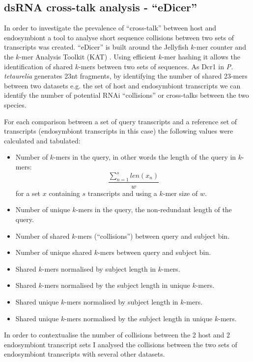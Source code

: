 \subsection{dsRNA cross-talk analysis - ``eDicer''}

In order to investigate the prevalence of ``cross-talk'' between 
host and endosymbiont a tool to analyse short sequence collisions between two sets
of transcripts was created.  ``eDicer'' is built around 
the Jellyfish \(k\)-mer counter \citep{Marcais2011} 
and the \(k\)-mer Analysis Toolkit (KAT) \citep{ClavijoKAT}.  Using efficient
\(k\)-mer hashing it allows the identification of shared \(k\)-mers between
two sets of sequences.  As Dcr1 in \textit{P. tetaurelia} generates
23nt fragments, by identifying the number of shared 23-mers between
two datasets e.g. the set of host and endosymbiont transcripts 
we can identify the number of potential RNAi ``collisions'' or cross-talks
between the two species. 

For each comparison between a set of query transcripts and a reference
set of transcripts (endosymbiont transcripts in this case)
the following
values were calculated and tabulated:
\begin{itemize}
    \item Number of \(k\)-mers in the query, in other words the length of the query
        in \(k\)-mers: \[
            \frac{\sum^s_{n=1} len(x_{n})}{w}
            \]
        for a set \(x\) containing \(s\) transcripts and using a \(k\)-mer size of \(w\).
    \item Number of unique \(k\)-mers in the query, the non-redundant length of 
        the query.
    \item Number of shared  \(k\)-mers (``collisions'') between query and subject bin.
    \item Number of unique shared \(k\)-mers between query and subject bin.
    \item Shared \(k\)-mers normalised by subject length in \(k\)-mers.
    \item Shared \(k\)-mers normalised by the subject length in unique \(k\)-mers.
    \item Shared unique \(k\)-mers normalised by subject length in \(k\)-mers.
    \item Shared unique \(k\)-mers normalised by the subject length in unique \(k\)-mers.
\end{itemize}

In order to contextualise the number of collisions between the 2
host and 2 endosymbiont transcript sets
I analysed the collisions between the two sets of endosymbiont transcripts 
with several other datasets.  

